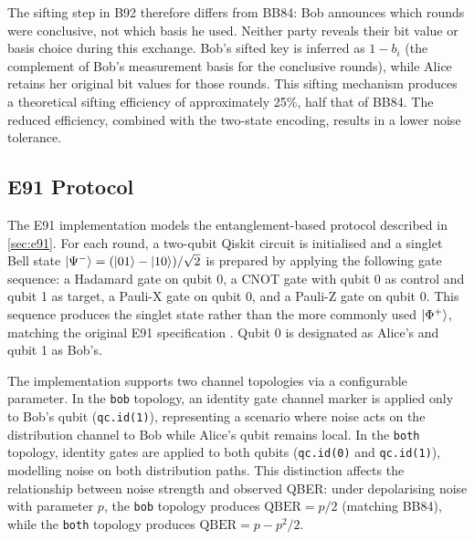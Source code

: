 \documentclass[10pt, a4paper]{report}
\begin{document}
The sifting step in B92 therefore differs from BB84: Bob announces which rounds were conclusive, not which basis he used. Neither party reveals their bit value or basis choice during this exchange. Bob's sifted key is inferred as $1 - b_i$ (the complement of Bob's measurement basis for the conclusive rounds), while Alice retains her original bit values for those rounds. This sifting mechanism produces a theoretical sifting efficiency of approximately 25\%, half that of BB84. The reduced efficiency, combined with the two-state encoding, results in a lower noise tolerance.



\subsection{E91 Protocol}

The E91 implementation models the entanglement-based protocol described in \cref{sec:e91}. For each round, a two-qubit Qiskit circuit is initialised and a singlet Bell state $\ket{\Psi^{-}} = (\ket{01} - \ket{10})/\sqrt{2}$ is prepared by applying the following gate sequence: a Hadamard gate on qubit 0, a CNOT gate with qubit 0 as control and qubit 1 as target, a Pauli-X gate on qubit 0, and a Pauli-Z gate on qubit 0. This sequence produces the singlet state rather than the more commonly used $\ket{\Phi^+}$, matching the original E91 specification \cite{E91}. Qubit 0 is designated as Alice's and qubit 1 as Bob's.

The implementation supports two channel topologies via a configurable parameter. In the \texttt{bob} topology, an identity gate channel marker is applied only to Bob's qubit (\texttt{qc.id(1)}), representing a scenario where noise acts on the distribution channel to Bob while Alice's qubit remains local. In the \texttt{both} topology, identity gates are applied to both qubits (\texttt{qc.id(0)} and \texttt{qc.id(1)}), modelling noise on both distribution paths. This distinction affects the relationship between noise strength and observed QBER: under depolarising noise with parameter $p$, the \texttt{bob} topology produces $\text{QBER} = p/2$ (matching BB84), while the \texttt{both} topology produces $\text{QBER} = p - p^2/2$.
\end{document}
